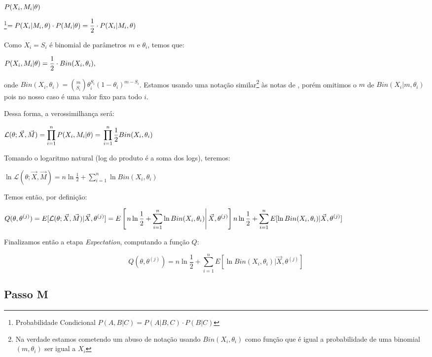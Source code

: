 \documentclass[12pt]{article}
\newcommand{\lik}{\mathcal{L}}
\begin{document}
$P(X_i,M_i|\theta)\\$

\footnote{Probabilidade Condicional $\displaystyle P(A,B|C)=P(A|B,C)\cdot P(B|C)$}$=P(X_i|M_i,\theta)\cdot P(M_i|\theta)\\ =\dfrac12\cdot P(X_i|M_i,\theta)\\$

Como $X_i=S_i$ é binomial de parâmetros $m$ e $\theta_i$, temos que:

$\\ \displaystyle P(X_i,M_i|\theta) = \frac12\cdot Bin(X_i,\theta_i),\\$

onde $\displaystyle Bin(X_i,\theta_i) = \binom{m}{S_i}\theta_i^{S_i}(1-\theta_i)^{m-S_i}$. Estamos usando uma notação similar\footnote{Na verdade estamos cometendo um abuso de notação usando $ Bin(X_i,\theta_i)$ como função que é igual a probabilidade de uma binomial $(m,\theta_i)$ ser igual a $X_i$} às notas de \cite{bin}, porém omitimos o $m$ de $Bin(X_i|m,\theta_i)$ pois no nosso caso é uma valor fixo para todo $i$.

Dessa forma, a verossimilhança será:

$\displaystyle\lik (\theta;\vec X, \vec M) = \prod_{i=1}^nP(X_i,M_i|\theta)=\\
\prod_{i=1}^n\frac12 Bin(X_i,\theta_i)$

Tomando o logaritmo natural (log do produto é a soma dos logs), teremos:

$\displaystyle\ln \lik (\theta;\vec X, \vec M) = n\ln\frac12+\sum_{i=1}^n\ln Bin(X_i,\theta_i)$

Temos então, por definição:

$\displaystyle Q(\theta,\theta^{(j)}) = E[\lik (\theta;\vec X, \vec M)|\vec X,\theta^{(j)}]\\=E\left[\left.n\ln\frac12+\sum_{i=1}^n\ln Bin(X_i,\theta_i)\right|\vec X,\theta^{(j)}\right]\\
n\ln\frac12+\sum_{i=1}^nE[\ln Bin(X_i,\theta_i)|\vec X,\theta^{(j)}]$

Finalizamos então a etapa \textit{Expectation}, computando a função $Q$:

\begin{equation}
    \label{eqn:qfun}
    \displaystyle Q(\theta,\theta^{(j)}) = n\ln\frac12+\sum_{i=1}^nE[\ln Bin(X_i,\theta_i)|\vec X,\theta^{(j)}]
\end{equation}

\subsection{Passo M}
\end{document}
